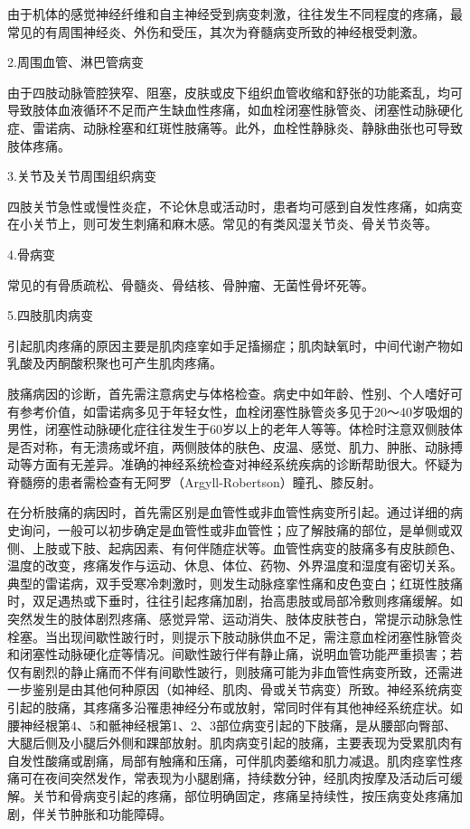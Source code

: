 由于机体的感觉神经纤维和自主神经受到病变刺激，往往发生不同程度的疼痛，最常见的有周围神经炎、外伤和受压，其次为脊髓病变所致的神经根受刺激。

2.周围血管、淋巴管病变%

由于四肢动脉管腔狭窄、阻塞，皮肤或皮下组织血管收缩和舒张的功能紊乱，均可导致肢体血液循环不足而产生缺血性疼痛，如血栓闭塞性脉管炎、闭塞性动脉硬化症、雷诺病、动脉栓塞和红斑性肢痛等。此外，血栓性静脉炎、静脉曲张也可导致肢体疼痛。

3.关节及关节周围组织病变%

四肢关节急性或慢性炎症，不论休息或活动时，患者均可感到自发性疼痛，如病变在小关节上，则可发生刺痛和麻木感。常见的有类风湿关节炎、骨关节炎等。

4.骨病变%

常见的有骨质疏松、骨髓炎、骨结核、骨肿瘤、无菌性骨坏死等。

5.四肢肌肉病变%

引起肌肉疼痛的原因主要是肌肉痉挛如手足搐搦症；肌肉缺氧时，中间代谢产物如乳酸及丙酮酸积聚也可产生肌肉疼痛。

肢痛病因的诊断，首先需注意病史与体格检查。病史中如年龄、性别、个人嗜好可有参考价值，如雷诺病多见于年轻女性，血栓闭塞性脉管炎多见于20～40岁吸烟的男性，闭塞性动脉硬化症往往发生于60岁以上的老年人等等。体检时注意双侧肢体是否对称，有无溃疡或坏疽，两侧肢体的肤色、皮温、感觉、肌力、肿胀、动脉搏动等方面有无差异。准确的神经系统检查对神经系统疾病的诊断帮助很大。怀疑为脊髓痨的患者需检查有无阿罗（Argyll-Robertson）瞳孔、膝反射。

在分析肢痛的病因时，首先需区别是血管性或非血管性病变所引起。通过详细的病史询问，一般可以初步确定是血管性或非血管性；应了解肢痛的部位，是单侧或双侧、上肢或下肢、起病因素、有何伴随症状等。血管性病变的肢痛多有皮肤颜色、温度的改变，疼痛发作与运动、休息、体位、药物、外界温度和湿度有密切关系。典型的雷诺病，双手受寒冷刺激时，则发生动脉痉挛性痛和皮色变白；红斑性肢痛时，双足遇热或下垂时，往往引起疼痛加剧，抬高患肢或局部冷敷则疼痛缓解。如突然发生的肢体剧烈疼痛、感觉异常、运动消失、肢体皮肤苍白，常提示动脉急性栓塞。当出现间歇性跛行时，则提示下肢动脉供血不足，需注意血栓闭塞性脉管炎和闭塞性动脉硬化症等情况。间歇性跛行伴有静止痛，说明血管功能严重损害；若仅有剧烈的静止痛而不伴有间歇性跛行，则肢痛可能为非血管性病变所致，还需进一步鉴别是由其他何种原因（如神经、肌肉、骨或关节病变）所致。神经系统病变引起的肢痛，其疼痛多沿罹患神经分布或放射，常同时伴有其他神经系统症状。如腰神经根第4、5和骶神经根第1、2、3部位病变引起的下肢痛，是从腰部向臀部、大腿后侧及小腿后外侧和踝部放射。肌肉病变引起的肢痛，主要表现为受累肌肉有自发性酸痛或剧痛，局部有触痛和压痛，可伴肌肉萎缩和肌力减退。肌肉痉挛性疼痛可在夜间突然发作，常表现为小腿剧痛，持续数分钟，经肌肉按摩及活动后可缓解。关节和骨病变引起的疼痛，部位明确固定，疼痛呈持续性，按压病变处疼痛加剧，伴关节肿胀和功能障碍。

